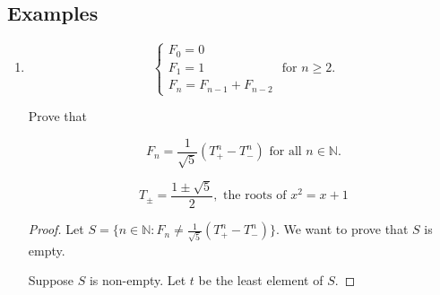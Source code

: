\documentclass[11pt]{article}
\begin{document}
\subsection{Examples}
\begin{enumerate}

    \item

          \[
              \left\{
              \begin{array}{l}
                  F_0 = 0 \\
                  F_1 = 1 \\
                  F_n = F_{n-1} + F_{n-2}
              \end{array}
              \right. \text{ for } n \geq 2.
          \]

          Prove that

          \[
              F_n = \frac{1}{\sqrt{5}} \left( T_+^n - T_-^n \right) \text{ for all } n \in \mathbb{N}.
          \]

          \[
              T_{\pm} = \frac{1 \pm \sqrt{5}}{2}, \text{ the roots of } x^2 = x + 1
          \]

          \begin{proof} Let $S = \{ n \in \mathbb{N} : F_n \neq \frac{1}{\sqrt{5}} \left( T_+^n - T_-^n \right) \}$. We want to prove that $S$ is empty.

              Suppose $S$ is non-empty. Let $t$ be the least element of $S$.


\end{proof}
\end{enumerate}
\end{document}
